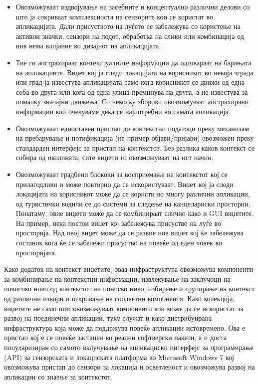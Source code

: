 \begin{itemize}
  \item Овозможуваат издвојување на засебните и концептуално
различни делови со што ја сокриваат комплексноста на сензорите кои се користат
во апликацијата. Дали присуството на луѓето се забележува со користење на
активни значки, сензори на подот, обработка на слики или комбинација од нив нема
влијание во дизајнот на апликацијата.
\item Тие ги апстрахираат контекстуалните
информации да одговараат на барањата на апликациите. Виџет кој ја следи
локацијата на корисникот во некоја зграда или град ја известува апликацијата
само кога корисникот се движи од една соба во друга или кога од една улица
преминува на друга, а не известува за помалку значајни движења. Со неколку
зборови овозможуваат апстрахирани информации кои очекуваме дека се најпотребни
во самата апликација.
\item Овозможуваат едноставен пристап до контекстни податоци
преку механизам на пребарување и нотификација (на пример објави/пријави)
овозможен преку стандарден интерфејс за пристап на контекстот. Без разлика каков
контекст се собира од околината, сите виџети го овозможуваат на ист начин.
\item Овозможуваат градбени блокови за восприемање на контекстот кој се прилагодливи и
може повторно да се искористуваат. Виџет кој ја следи локацијата на корисникот
може да се користи во многу различни апликации, од туристички водичи се до
системи за следење на канцелариски простории. Понатаму, овие виџети може да се
комбинираат слично како и GUI виџетите. На пример, нека постои виџет кој
забележува присуство на луѓе во просторија. Над овој виџет може да се развие нов
виџет кој ќе забележува состанок кога ќе се забележи присуство на повеќе од еден
човек во просторијата. 
\end{itemize}

Како додаток на контекст виџетите, оваа инфраструктура овозможува компоненти за
комбинирање на контекстни информации, извлекување на заклучоци на повисоко ниво
од контекстот на пониско ниво, собирање и групирање на контекст од различни
извори и откривање на соодветни компоненти. Како колекција, виџетите не само што
овозможуваат компоненти кои може да се искористат за развој на поединечни
апликации, туку служат и како дистрибуирана инфраструктура која може да
поддржува повеќе апликации истовремено. Ова е пристап кој е се повеќе застапен
во реални софтверски пакети, а и доста популаризиран со самото вклучување на
апликациски интерфејс за програмирање (API) за сензорската и локациската
платформа во Microsoft Windows 7 кој овозможува пристап до сензори за локација и
осветленост и овозможува развој на апликации со знаење за контекстот.

